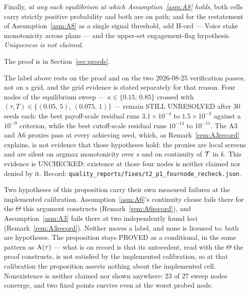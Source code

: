 \begin{proposition}
Finally, \emph{at any such equilibrium at which Assumption~\ref{asm:A8} holds}, both cells carry
strictly positive probability and both are on path; and for the restatement of
Assumption~\ref{asm:A8} as a single signal threshold, add H-ord --- Voice stake monotonicity across
plans --- and the upper-set engagement-flag hypothesis. \emph{Uniqueness is not claimed.}
\end{proposition}

The proof is in Section~\ref{sec:proofs}.

\begin{remark}
\label{rem:P1record}
The label above rests on the proof and on the two 2026-08-25 verification passes, not on a grid, and
the grid evidence is stated separately for that reason. Four nodes of the equilibrium sweep ---
$\kappa \in \{0.15,\,0.85\}$ crossed with $(\tau,T) \in \{(0.05,\,5),\,(0.075,\,1)\}$ --- remain
STILL UNRESOLVED after $30$ seeds each: the best payoff-scale residual runs
$3.1\times10^{-4}$ to $1.5\times10^{-3}$ against a $10^{-9}$ criterion, while the best cutoff-scale
residual runs $10^{-14}$ to $10^{-11}$. The A3 and A6 proxies pass at every achieving seed, which,
as Remark~\ref{rem:A3record} explains, is not evidence that those hypotheses hold: the proxies are
local screens and are silent on argmax monotonicity over $s$ and on continuity of $\mathcal{T}$ in $k$.
This evidence is UNCHECKED: existence at those four nodes is neither claimed nor denied by
it. Record: \texttt{quality\_reports/fixes/t2\_p1\_fournode\_recheck.json}.

Two hypotheses of this proposition carry their own measured failures at the implemented calibration.
Assumption~\ref{asm:A6}'s continuity clause fails there for the $\Theta$ this argument constructs
(Remark~\ref{rem:A6record}), and Assumption~\ref{asm:A3} fails there at two independently found loci
(Remark~\ref{rem:A3record}). Neither moves a label, and none is licensed to: both are hypotheses.
The proposition stays PROVED as a conditional, in the same pattern as $\mathrm{A}(\tau)$ --- what is on
record is that its antecedent, read with the $\Theta$ the proof constructs, is not satisfied by the
implemented calibration, so at that calibration the proposition asserts nothing about the implemented
cell. Nonexistence is neither claimed nor shown anywhere: $23$ of $27$ sweep nodes converge, and two
fixed points survive even at the worst probed node.
\end{remark}

